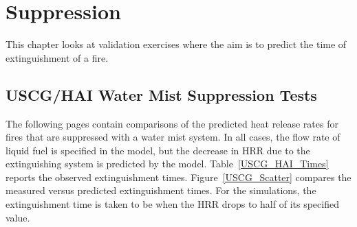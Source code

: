 
\chapter{Suppression}

This chapter looks at validation exercises where the aim is to predict the time of extinguishment of a fire.


\section{USCG/HAI Water Mist Suppression Tests}

The following pages contain comparisons of the predicted heat release rates for fires that are suppressed with a water mist system. In all cases, the flow rate of liquid
fuel is specified in the model, but the decrease in HRR due to the extinguishing system is predicted by the model. Table~\ref{USCG_HAI_Times} reports the observed extinguishment
times. Figure~\ref{USCG_Scatter} compares the measured versus predicted extinguishment times. For the simulations, the extinguishment time is taken to be when the HRR drops to
half of its specified value.

